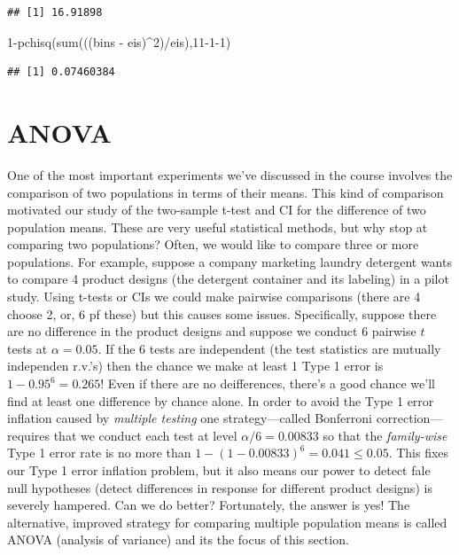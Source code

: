 \documentclass[
]{book}
\newenvironment{Shaded}{\begin{snugshade}}{\end{snugshade}}
\newcommand{\DecValTok}[1]{\textcolor[rgb]{0.00,0.00,0.81}{#1}}
\newcommand{\FunctionTok}[1]{\textcolor[rgb]{0.00,0.00,0.00}{#1}}
\newcommand{\NormalTok}[1]{#1}
\newcommand{\SpecialCharTok}[1]{\textcolor[rgb]{0.00,0.00,0.00}{#1}}
\begin{document}
\begin{verbatim}
## [1] 16.91898
\end{verbatim}

\begin{Shaded}
\begin{Highlighting}[]
\DecValTok{1}\SpecialCharTok{{-}}\FunctionTok{pchisq}\NormalTok{(}\FunctionTok{sum}\NormalTok{(((bins }\SpecialCharTok{{-}}\NormalTok{ eis)}\SpecialCharTok{\^{}}\DecValTok{2}\NormalTok{)}\SpecialCharTok{/}\NormalTok{eis),}\DecValTok{11{-}1{-}1}\NormalTok{)}
\end{Highlighting}
\end{Shaded}

\begin{verbatim}
## [1] 0.07460384
\end{verbatim}

\hypertarget{anova}{%
\chapter{ANOVA}\label{anova}}

One of the most important experiments we've discussed in the course involves the comparison of two populations in terms of their means. This kind of comparison motivated our study of the two-sample t-test and CI for the difference of two population means. These are very useful statistical methods, but why stop at comparing two populations? Often, we would like to compare three or more populations. For example, suppose a company marketing laundry detergent wants to compare 4 product designs (the detergent container and its labeling) in a pilot study. Using t-tests or CIs we could make pairwise comparisons (there are 4 choose 2, or, 6 pf these) but this causes some issues. Specifically, suppose there are no difference in the product designs and suppose we conduct 6 pairwise \(t\) tests at \(\alpha = 0.05\). If the 6 tests are independent (the test statistics are mutually independen r.v.'s) then the chance we make at least 1 Type 1 error is \(1-0.95^6 = 0.265\)! Even if there are no deifferences, there's a good chance we'll find at least one difference by chance alone. In order to avoid the Type 1 error inflation caused by \emph{multiple testing} one strategy---called Bonferroni correction---requires that we conduct each test at level \(\alpha / 6 = 0.00833\) so that the \emph{family-wise} Type 1 error rate is no more than \(1-(1-0.00833)^6 = 0.041 \leq 0.05\). This fixes our Type 1 error inflation problem, but it also means our power to detect fale null hypotheses (detect differences in response for different product designs) is severely hampered. Can we do better? Fortunately, the answer is yes! The alternative, improved strategy for comparing multiple population means is called ANOVA (analysis of variance) and its the focus of this section.
\end{document}
